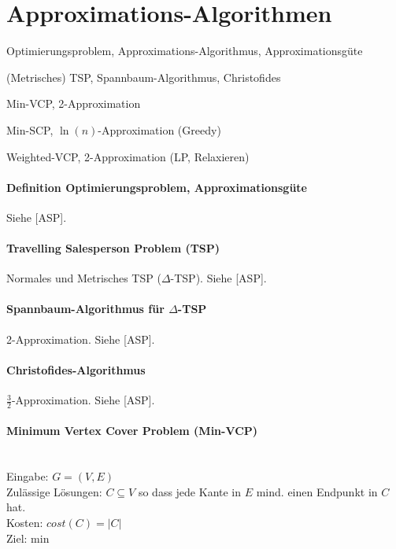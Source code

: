 \section{Approximations-Algorithmen}

\begin{takeaway}
    \item Optimierungsproblem, Approximations-Algorithmus, Approximationsgüte
    \item (Metrisches) TSP, Spannbaum-Algorithmus, Christofides
    \item Min-VCP, 2-Approximation
    \item Min-SCP, $\ln(n)$-Approximation (Greedy)
    \item Weighted-VCP, 2-Approximation (LP, Relaxieren)
\end{takeaway}

\paragraph{Definition Optimierungsproblem, Approximationsgüte}
Siehe [ASP].

\paragraph{Travelling Salesperson Problem (TSP)}
Normales und Metrisches TSP ($\Delta$-TSP).
Siehe [ASP].

\paragraph{Spannbaum-Algorithmus für $\Delta$-TSP}
2-Approximation.
Siehe [ASP].

\paragraph{Christofides-Algorithmus}
$\frac{3}{2}$-Approximation.
Siehe [ASP].

\paragraph{Minimum Vertex Cover Problem (Min-VCP)} \mbox{}\\
Eingabe: $G=(V,E)$ \\
Zulässige Lösungen: $C \subseteq V$ so dass jede Kante in $E$ mind. einen Endpunkt in $C$ hat. \\
Kosten: $cost(C) = |C|$ \\
Ziel: min


